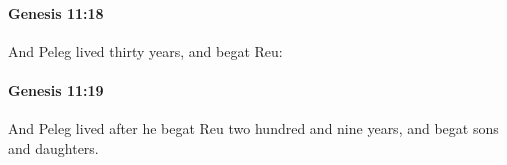 		\paragraph{Genesis 11:18} %
			\label{GENESIS-11-18}

			And Peleg lived thirty years, and begat Reu:


		\paragraph{Genesis 11:19} %
			\label{GENESIS-11-19}

			And Peleg lived after he begat Reu two hundred and nine years, and begat sons and daughters.


